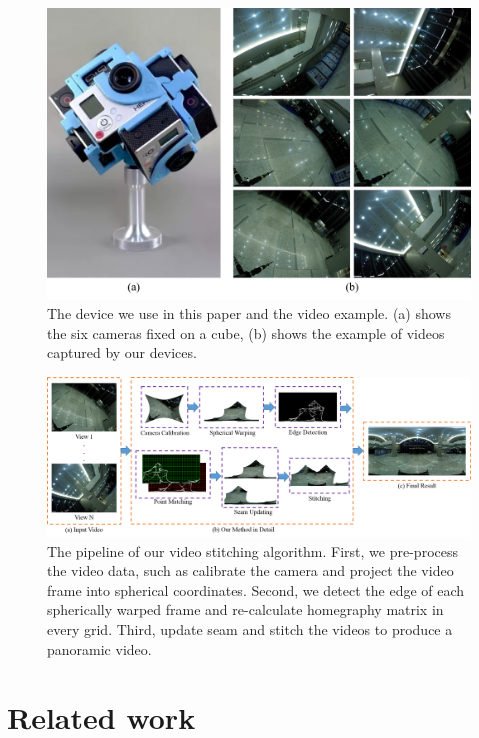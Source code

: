 \documentclass[conference]{IEEEtran}
\begin{document}
\begin{figure}[t]
\centering
\includegraphics[scale=0.36]{picture34.png}
\caption{The device we use in this paper and the video example. (a) shows the six cameras fixed on a cube, (b) shows the example of videos captured by our devices.}
\label{fig:equipment}
\end{figure}

\begin{figure}
\centering
\includegraphics[scale=0.54]{picture44.png}
\caption{The pipeline of our video stitching algorithm. First, we pre-process the video data, such as calibrate the camera
and project the video frame into spherical coordinates. Second, we detect the edge of each spherically
warped frame and re-calculate
homegraphy matrix in every grid. Third, update seam and stitch the videos to produce a panoramic video.}
\label{fig:res}
\end{figure}

\section{Related work}
\label{sec:related}
\end{document}
